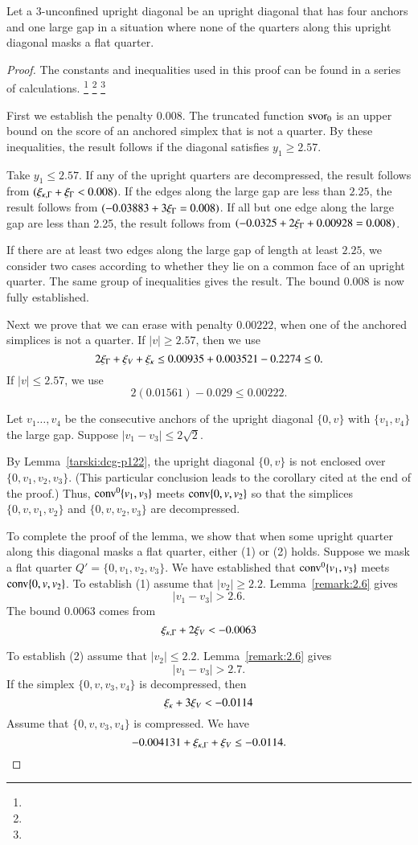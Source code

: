 \begin{definition}
Let a $3$-unconfined upright diagonal be an upright diagonal that
has four anchors and one large gap in a situation where none of
the quarters along this upright diagonal masks a flat quarter.
\end{definition}

\begin{proof}
The constants and inequalities used in this proof can be found in
a series of calculations.%
\footnote{} %
\footnote{} %
\footnote{} %


First we establish the penalty $0.008$. The truncated function
$\operatorname{svor}_0$ is an upper bound on the score of an anchored simplex
that is not a quarter.  By these inequalities, the result follows
if the diagonal satisfies $y_1\ge 2.57$.

Take $y_1\le 2.57$. If any of the upright quarters are decompressed, 
the result follows from $(\xi_{\kappa,\Gamma}+\xi_\Gamma<0.008)$. If the edges
along the large gap are less than $2.25$, the result follows from
$(-0.03883+3\xi_\Gamma = 0.008)$. If all but one edge along the large
gap are  less than 2.25, the result follows from $(-0.0325 + 2\xi_\Gamma
+ 0.00928 = 0.008)$.

If there are at least two edges along the large gap of length at
least $2.25$, we consider two cases according to whether they lie
on a common face of an upright quarter.  The same group of
inequalities gives the result. The bound $0.008$ is now fully
established.

\smallskip
Next we prove that we can erase with penalty $0.00222$, when one
of the anchored simplices is not a quarter.  If $|v|\ge2.57$, then
we use
    $$2\xi_\Gamma + \xi_V + \xi_\kappa \le 0.00935+0.003521 -0.2274\le 0.$$
If $|v|\le2.57$, we use
    $$2(0.01561)-0.029 \le 0.00222.$$

\smallskip
Let $v_1\ldots,v_4$ be the consecutive anchors of
the upright diagonal $\{0,v\}$ with $\{v_1,v_4\}$ the large gap.
Suppose $|v_1-v_3|\le 2\sqrt{2}$.

By Lemma~\ref{tarski:dcg-p122}, 
the upright diagonal $\{0,v\}$ is not enclosed over
$\{0,v_1,v_2,v_3\}$.   
(This particular conclusion leads to the corollary cited at the
end of the proof.)
Thus, ${\operatorname{conv}}^0\{v_1,v_3\}$ meets ${\operatorname{conv}}\{0,v,v_2\}$ so that the
simplices $\{0,v,v_1,v_2\}$
and $\{0,v,v_2,v_3\}$ are decompressed.

To complete the proof of the lemma, we show that when
some upright quarter along this diagonal masks a flat quarter, 
 either (1) or (2) holds.
Suppose we mask a flat quarter $Q'=\{0,v_1,v_2,v_3\}$.
We have established that ${\operatorname{conv}}^0\{v_1,v_3\}$ meets 
${\operatorname{conv}}\{0,v,v_2\}$.
To establish (1) assume that $|v_2|\ge 2.2$.  Lemma~\ref{remark:2.6} 
gives
    $$|v_1-v_3|>2.6.$$
The bound $0.0063$ comes from
    $$\xi_{\kappa,\Gamma} + 2\xi_V < -0.0063$$

To establish (2) assume that $|v_2|\le 2.2$. Lemma~\ref{remark:2.6} gives
    $$|v_1-v_3|>2.7.$$
  If the simplex
$\{0,v,v_3,v_4\}$ is decompressed, then $$\xi_\kappa + 3\xi_V  < -0.0114$$
Assume that $\{0,v,v_3,v_4\}$ is compressed. We have
    $$-0.004131 +\xi_{\kappa,\Gamma} + \xi_V \le -0.0114.$$
\end{proof}

